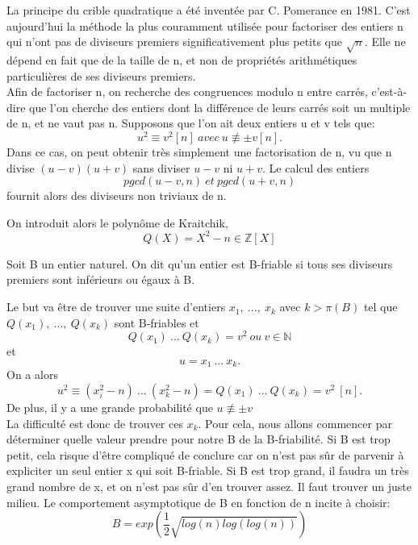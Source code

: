 La principe du crible quadratique a été inventée par C. Pomerance en 1981. 
C’est aujourd’hui la méthode la plus couramment utilisée pour factoriser des entiers n qui n’ont pas de diviseurs premiers significativement plus petits que $\sqrt{n}$. 
Elle ne dépend en fait que de la taille de n, et non de propriétés arithmétiques particulières de ses diviseurs premiers.\\

Afin de factoriser n, on recherche des congruences modulo n entre carrés, c'est-à-dire que l'on cherche des entiers dont la différence de leurs carrés soit un multiple de n, et ne vaut pas n.
Supposons que l'on ait deux entiers u et v tels que: \[u^2 \equiv v^2 [n] ~ avec ~ u \not\equiv \pm v [n]\textrm{.}\]
Dans ce cas, on peut obtenir très simplement une factorisation de n, vu que n divise $(u - v)(u + v)$ sans diviser $u - v$ ni $u + v$. Le calcul des entiers \[pgcd(u - v, n) ~ et ~ pgcd(u + v, n)\] fournit alors des diviseurs non triviaux de n.\\

\begin{definition*}\label{polynome de Kraitchik}

On introduit alors le polynôme de Kraitchik, \[Q(X) = X^2 - n \in \mathbb{Z}[X]\]
    
\end{definition*}

\begin{definition*}[friabilité]\label{friable}
    Soit B un entier naturel. On dit qu'un entier est B-friable si tous ses diviseurs premiers sont inférieurs ou égaux à B.\\
    
\end{definition*}
Le but va être de trouver une suite d'entiers $x_1, ~ ..., ~ x_k$ avec  $k > \pi(B)$ tel que $Q(x_1), ~ ..., ~ Q(x_k)$ sont B-friables et 
\[Q(x_1) ~ ... ~ Q(x_k) = v^2 ~ ou ~ v\in \mathbb{N}\] et \[u = x_1 ~ ... ~ x_k.\]
On a alors \[u^2 \equiv (x_i^2 - n) ~ ... ~ (x_k^2 - n) = Q(x_1) ~ ... ~ Q(x_k) = v^2 ~ [n].\]
De plus, il y a une grande probabilité que $u \not\equiv \pm v$ \\

La difficulté est donc de trouver ces $x_k$. 
Pour cela, nous allons commencer par déterminer quelle valeur prendre pour notre B de la B-friabilité. Si B est trop petit, cela risque d'être compliqué de conclure car on n'est pas sûr de parvenir à expliciter un seul entier x qui soit B-friable. Si B est trop grand, il faudra un très grand nombre de x, et on n'est pas sûr d'en trouver assez. Il faut trouver un juste milieu.
Le comportement asymptotique de B en fonction de n incite à choisir: \[B = exp(\frac{1}{2}\sqrt{log(n)log(log(n))})\]

